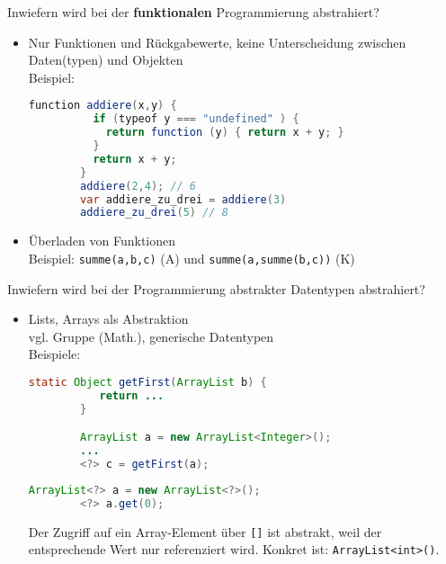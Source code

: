 \begin{card}
	Inwiefern wird bei der \textbf{funktionalen} Programmierung abstrahiert?
	\hr
	\begin{itemize}
	\item Nur Funktionen und Rückgabewerte, keine Unterscheidung zwischen Daten(typen) und  Objekten\\
		Beispiel:
		\begin{lstlisting}[language=Java]
		function addiere(x,y) {
		  if (typeof y === "undefined" ) {
		    return function (y) { return x + y; }
		  }
		  return x + y;
		}
		addiere(2,4); // 6
		var addiere_zu_drei = addiere(3)
		addiere_zu_drei(5) // 8
		\end{lstlisting}
	\item Überladen von Funktionen\\
		Beispiel: \texttt{summe(a,b,c)} (A) und \texttt{summe(a,summe(b,c))} (K)
	\end{itemize}
\end{card}

\begin{card}
	Inwiefern wird bei der Programmierung abstrakter Datentypen abstrahiert?
	\hr
	\begin{itemize}
	\item Lists, Arrays als Abstraktion\\
		vgl. Gruppe (Math.), generische Datentypen\\
		Beispiele:
		\begin{lstlisting}[language=Java]
		static Object getFirst(ArrayList b) {
		   return ...
		}

		ArrayList a = new ArrayList<Integer>();
		...
		<?> c = getFirst(a);
		\end{lstlisting}

		\begin{lstlisting}[language=Java]
		ArrayList<?> a = new ArrayList<?>();
		<?> a.get(0);
		\end{lstlisting}
    Der Zugriff auf ein Array-Element über \texttt{[]} ist abstrakt, weil der entsprechende Wert nur referenziert wird.
    Konkret ist: \texttt{ArrayList<int>()}.
	\end{itemize}
\end{card}

